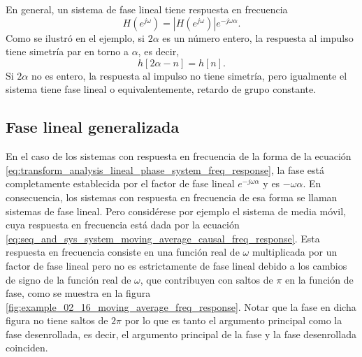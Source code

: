 \documentclass[a4paper]{report}
\begin{document}
En general, un sistema de fase lineal tiene respuesta en frecuencia
\begin{equation}\label{eq:transform_analysis_lineal_phase_system_freq_response}
 H(e^{j\omega})=|H(e^{j\omega})|e^{-j\omega\alpha}. 
\end{equation}
Como se ilustró en el ejemplo, si \(2\alpha\) es un número entero, la respuesta al impulso tiene simetría par en torno a \(\alpha\), es decir,
\[
 h[2\alpha-n]=h[n].
\]
Si \(2\alpha\) no es entero, la respuesta al impulso no tiene simetría, pero igualmente el sistema tiene fase lineal o equivalentemente, retardo de grupo constante.

\subsection{Fase lineal generalizada}

En el caso de los sistemas con respuesta en frecuencia de la forma de la ecuación \ref{eq:transform_analysis_lineal_phase_system_freq_response}, la fase está completamente establecida por el factor de fase lineal \(e^{-j\omega\alpha}\) y es \(-\omega\alpha\). En consecuencia, los sistemas con respuesta en frecuencia de esa forma se llaman sistemas de fase lineal. Pero considérese por ejemplo el sistema de media móvil, cuya respuesta en frecuencia está dada por la ecuación \ref{eq:seq_and_sys_system_moving_average_causal_freq_response}. Esta respuesta en frecuencia consiste en una función real de \(\omega\) multiplicada por un factor de fase lineal pero no es estrictamente de fase lineal debido a los cambios de signo de la función real de \(\omega\), que contribuyen con saltos de \(\pi\) en la función de fase, como se muestra en la figura \ref{fig:example_02_16_moving_average_freq_response}. Notar que la fase en dicha figura no tiene saltos de \(2\pi\) por lo que es tanto el argumento principal como la fase desenrollada, es decir, el argumento principal de la fase y la fase desenrollada coinciden.
\end{document}
